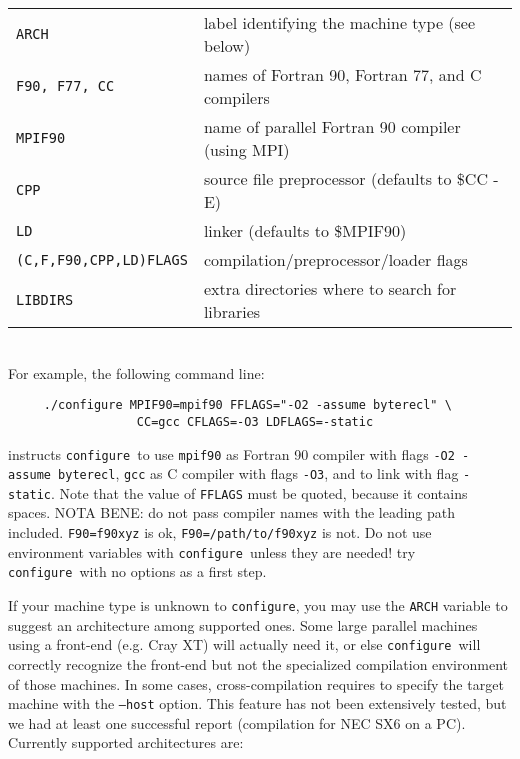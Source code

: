 \documentclass[12pt,a4paper]{article}
\def\configure{\texttt{configure}}
\begin{document}
\begin{tabular}{ll}
\texttt{ARCH}& label identifying the machine type (see below)\\
\texttt{F90, F77, CC} &names of Fortran 90, Fortran 77, and C compilers\\
\texttt{MPIF90} &       name of parallel Fortran 90 compiler (using MPI)\\
\texttt{CPP} &          source file preprocessor (defaults to \$CC -E)\\
\texttt{LD} &           linker (defaults to \$MPIF90)\\
\texttt{(C,F,F90,CPP,LD)FLAGS}& compilation/preprocessor/loader flags\\
\texttt{LIBDIRS}&     extra directories where to search for libraries\\
\end{tabular}\\
For example, the following command line:
\begin{verbatim}
     ./configure MPIF90=mpif90 FFLAGS="-O2 -assume byterecl" \
                  CC=gcc CFLAGS=-O3 LDFLAGS=-static
\end{verbatim}
instructs \configure\ to use \texttt{mpif90} as Fortran 90 compiler
with flags \texttt{-O2 -assume byterecl}, \texttt{gcc} as C compiler with
flags \texttt{-O3}, and to link with flag \texttt{-static}.
Note that the value of \texttt{FFLAGS} must be quoted, because it contains
spaces. NOTA BENE: do not pass compiler names with the leading path
included. \texttt{F90=f90xyz} is ok, \texttt{F90=/path/to/f90xyz} is not.
Do not use
environment variables with \configure\ unless they are needed! try
\configure\ with no options as a first step.

If your machine type is unknown to \configure, you may use the
\texttt{ARCH}
variable to suggest an architecture among supported ones. Some large
parallel machines using a front-end (e.g. Cray XT) will actually
need it, or else \configure\ will correctly recognize the front-end
but not the specialized compilation environment of those
machines. In some cases, cross-compilation requires to specify the target machine with the
\texttt{--host} option. This feature has not been extensively
tested, but we had at least one successful report (compilation
for NEC SX6 on a PC). Currently supported architectures are:
\end{document}
